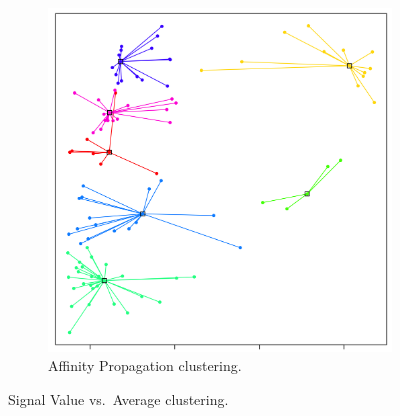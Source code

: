 \documentclass[11pt, letterpaper]{article}            %
\begin{document}
\begin{figure}[htbp]
\begin{subfigure}[b]{0.32\textwidth}
    \includegraphics[height=\textwidth]{./gfx/ap15.png}
    \caption{Affinity Propagation clustering.\label{fig:svavg:ap}}
  \end{subfigure}

  \caption{Signal Value vs.\ Average clustering.\label{fig:svavg}}
\end{figure}
\end{document}
